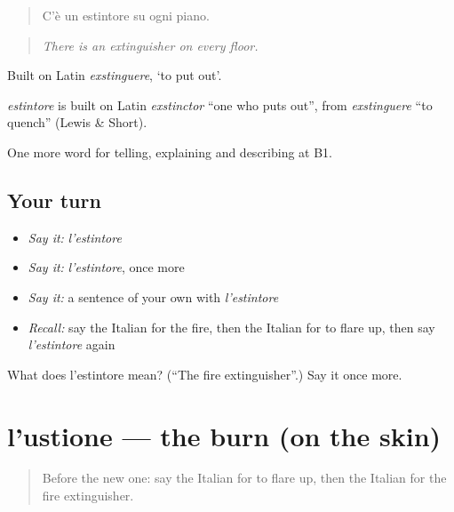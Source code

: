 \begin{quote}
C'è un estintore su ogni piano.
\end{quote}

\begin{quote}
\emph{There is an extinguisher on every floor.}
\end{quote}

Built on Latin \emph{exstinguere}, ‘to put out’.

\begin{cousinweb}
\emph{estintore} is built on Latin \emph{exstinctor} \textquotedblleft{}one who puts out\textquotedblright{}, from \emph{exstinguere} \textquotedblleft{}to quench\textquotedblright{} (Lewis \& Short).
\end{cousinweb}

\begin{grammarlens}[title={What you've built}]
One more word for telling, explaining and describing at B1.
\end{grammarlens}

\subsection*{Your turn}
\begin{itemize}
\raggedright
  \item \emph{Say it:} \emph{l'estintore}
  \item \emph{Say it:} \emph{l'estintore}, once more
  \item \emph{Say it:} a sentence of your own with \emph{l'estintore}
  \item \emph{Recall:} say the Italian for the fire, then the Italian for to flare up, then say \emph{l'estintore} again
\end{itemize}

\begin{tcolorbox}[breakable,colback=teal!4,colframe=teal!35!black,title={Before you move on}]
What does l'estintore mean? (\textquotedblleft{}The fire extinguisher\textquotedblright{}.) Say it once more.
\end{tcolorbox}
\section[l'ustione]{l'ustione — the burn (on the skin)}

\label{lesson:IT-C302-ustione}



\begin{quote}
Before the new one: say the Italian for to flare up, then the Italian for the fire extinguisher.
\end{quote}

